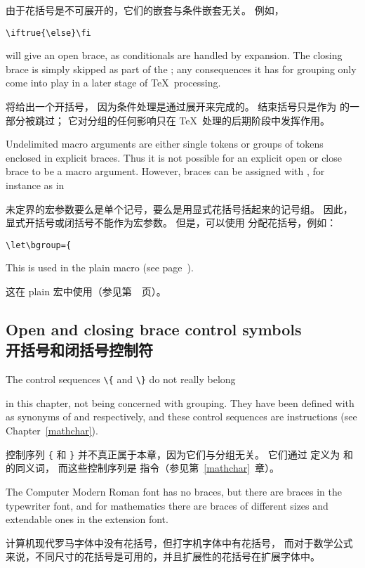 由于花括号是不可展开的，它们的嵌套与条件嵌套无关。
例如，
\begin{verbatim}
\iftrue{\else}\fi
\end{verbatim}
will give an open brace,
as conditionals are handled by expansion. The closing
brace is simply skipped as part of the ;
any consequences it has for grouping only come into
play in a later stage of \TeX\ processing.

将给出一个开括号，
因为条件处理是通过展开来完成的。
结束括号只是作为  的一部分被跳过；
它对分组的任何影响只在 \TeX\ 处理的后期阶段中发挥作用。

Undelimited macro arguments are either single tokens
or groups of tokens enclosed in explicit braces.
Thus it is not possible for an explicit open or close brace
to be a macro argument. However, braces can be assigned
with , for instance as in 

未定界的宏参数要么是单个记号，要么是用显式花括号括起来的记号组。
因此，显式开括号或闭括号不能作为宏参数。
但是，可以使用  分配花括号，例如：
\begin{verbatim}
\let\bgroup={
\end{verbatim}
This is used in the plain  macro
(see page~\pageref{footnote:ex}).

这在 plain  宏中使用（参见第~\pageref{footnote:ex}~页）。

\subsection{Open and closing brace control symbols\\开括号和闭括号控制符}

The control sequences \verb-\{- and \verb-\}- do not really belong
\cstoidx{}\par\cstoidx{}\par
in this chapter,  not being concerned with grouping.
They have been defined with  as synonyms of
 and  respectively,
and these control sequences are  instructions
(see Chapter~\ref{mathchar}).

控制序列 \verb-{- 和 \verb-}- 并不真正属于本章，因为它们与分组无关。
它们通过  定义为  和  的同义词，
而这些控制序列是  指令（参见第~\ref{mathchar}~章）。

The Computer Modern Roman font has no braces, but there are
braces in the typewriter font, and for mathematics 
there are braces of different sizes \ldash and extendable ones \rdash in
the extension font.

计算机现代罗马字体中没有花括号，但打字机字体中有花括号，
而对于数学公式来说，不同尺寸的花括号是可用的，并且扩展性的花括号在扩展字体中。

